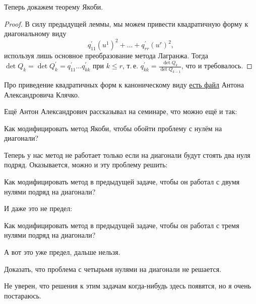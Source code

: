 Теперь докажем теорему Якоби.

\begin{proof}
    В силу предыдущей леммы, мы можем привести квадратичную форму к диагональному виду
    \[
        q^\prime_{11}(u^1)^2 + \ldots + q^\prime_{rr}(u^r)^2,
    \]
    используя лишь основное преобразование метода Лагранжа. Тогда $\det Q_k = \det Q^\prime_k = q^\prime_{11}\ldots q^\prime_{kk}$ при $k \leqslant r$, т.\,е. $q^\prime_{kk} = \frac{\det Q_k}{\det Q_{k - 1}}$, что и требовалось.
\end{proof}

Про приведение квадратичных форм к каноническому виду \href{http://halgebra.math.msu.su/staff/klyachko/teaching/lin.al/QU.PDF}{есть файл} Антона Александровича Клячко. 

Ещё Антон Александрович рассказывал на семинаре, что можно ещё и так:

\begin{problem}[А.\,А. Клячко]
    Как модифицировать метод Якоби, чтобы обойти проблему с нулём на диагонали?
\end{problem}

Теперь у нас метод не работает только если на диагонали будут стоять два нуля подряд. Оказывается, можно и эту проблему решить:

\begin{problem}[А.\,А. Клячко]
    Как модифицировать метод в предыдущей задаче, чтобы он работал с двумя нулями подряд на диагонали?
\end{problem}

И даже это не предел:

\begin{problem}[А.\,А. Клячко]
    Как модифицировать метод в предыдущей задаче, чтобы он работал с тремя нулями подряд на диагонали?
\end{problem}

А вот это уже предел, дальше нельзя.

\begin{problem}[А.\,А. Клячко]
    Доказать, что проблема с четырьмя нулями на диагонали не решается.
\end{problem}

Не уверен, что решения к этим задачам когда-нибудь здесь появятся, но я очень постараюсь.

